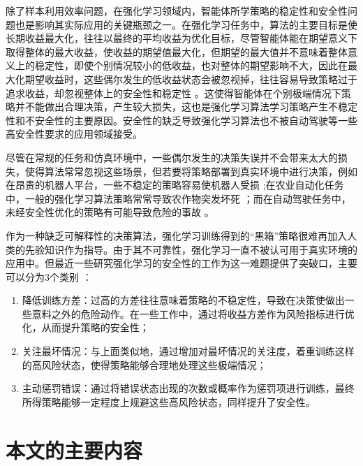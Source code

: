 除了样本利用效率问题，在强化学习领域内，智能体所学策略的稳定性和安全性问题也是影响其实际应用的关键瓶颈之一\cite{junges2016safety}。在强化学习任务中，算法的主要目标是使长期收益最大化，往往以最终的平均收益为优化目标，尽管智能体能在期望意义下取得整体的最大收益，使收益的期望值最大化，但期望的最大值并不意味着整体意义上的稳定性，即使个别情况较小的低收益，也对整体的期望影响不大，因此在最大化期望收益时，这些偶尔发生的低收益状态会被忽视掉，往往容易导致策略过于追求收益，却忽视整体上的安全性和稳定性 \cite{garcia2015comprehensive,xiong2016combining}。这使得智能体在个别极端情况下策略并不能做出合理决策，产生较大损失，这也是强化学习算法学习策略产生不稳定性和不安全性的主要原因。安全性的缺乏导致强化学习算法也不被自动驾驶等一些高安全性要求的应用领域接受\cite{ling2015application,cheng2019end,zhang2020cautious}。

尽管在常规的任务和仿真环境中，一些偶尔发生的决策失误并不会带来太大的损失，使得算法常常忽视这些场景，但若要将策略部署到真实环境中进行决策，例如在昂贵的机器人平台，一些不稳定的策略容易使机器人受损 \cite{kormushev2010robot};在农业自动化任务中，一般的强化学习算法策略常常导致农作物突发坏死 \cite{bu2019smart}；而在自动驾驶任务中，未经安全性优化的策略有可能导致危险的事故 \cite{sallab2017deep,ferdowsi2018robust}。

作为一种缺乏可解释性的决策算法，强化学习训练得到的“黑箱”策略很难再加入人类的先验知识作为指导\cite{mousavi2020black,wei2021non}。由于其不可靠性，强化学习一直不被认可用于真实环境的应用中\cite{berkenkamp2017safe,jin2020stability}。但最近一些研究强化学习的安全性的工作为这一难题提供了突破口，主要可以分为3个类别 \cite{munos2016safe}：

\begin{enumerate}[1)]
    \item 降低训练方差：过高的方差往往意味着策略的不稳定性，导致在决策使做出一些意料之外的危险动作。在一些工作中，通过将收益方差作为风险指标进行优化，从而提升策略的安全性；
    \item 关注最坏情况：与上面类似地，通过增加对最坏情况的关注度，着重训练这样的高风险状态，使得策略能够合理地处理这些极端情况；
    \item 主动惩罚错误：通过将错误状态出现的次数或概率作为惩罚项进行训练，最终所得策略能够一定程度上规避这些高风险状态，同样提升了安全性。
\end{enumerate}

\section{本文的主要内容}


